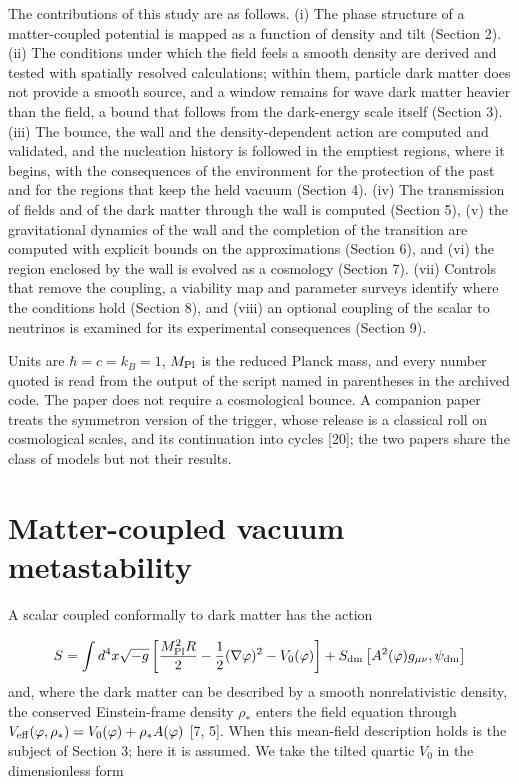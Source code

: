 \documentclass[preprint,12pt]{elsarticle}
\begin{document}
The contributions of this study are as follows. (i) The phase structure of a matter-coupled potential is mapped as a function of density and tilt (Section 2). (ii) The conditions under which the field feels a smooth density are derived and tested with spatially resolved calculations; within them, particle dark matter does not provide a smooth source, and a window remains for wave dark matter heavier than the field, a bound that follows from the dark-energy scale itself (Section 3). (iii) The bounce, the wall and the density-dependent action are computed and validated, and the nucleation history is followed in the emptiest regions, where it begins, with the consequences of the environment for the protection of the past and for the regions that keep the held vacuum (Section 4). (iv) The transmission of fields and of the dark matter through the wall is computed (Section 5), (v) the gravitational dynamics of the wall and the completion of the transition are computed with explicit bounds on the approximations (Section 6), and (vi) the region enclosed by the wall is evolved as a cosmology (Section 7). (vii) Controls that remove the coupling, a viability map and parameter surveys identify where the conditions hold (Section 8), and (viii) an optional coupling of the scalar to neutrinos is examined for its experimental consequences (Section 9).

Units are $\hbar=c=k_B=1$, $M_{\rm Pl}$ is the reduced Planck mass, and every number quoted is read from the output of the script named in parentheses in the archived code. The paper does not require a cosmological bounce. A companion paper treats the symmetron version of the trigger, whose release is a classical roll on cosmological scales, and its continuation into cycles [20]; the two papers share the class of models but not their results.

\section{Matter-coupled vacuum metastability}
A scalar coupled conformally to dark matter has the action

\begin{equation}
S=\int d^4x\sqrt{-g}\left[\frac{M_{\rm Pl}^2R}{2}-\frac{1}{2}(\nabla\varphi)^2-V_0(\varphi)\right]+S_{\rm dm}\left[A^2(\varphi)g_{\mu\nu},\psi_{\rm dm}\right]
\end{equation}
and, where the dark matter can be described by a smooth nonrelativistic density, the conserved Einstein-frame density $\rho_*$ enters the field equation through $V_{\rm eff}(\varphi,\rho_*)=V_0(\varphi)+\rho_*A(\varphi)$ [7, 5]. When this mean-field description holds is the subject of Section 3; here it is assumed. We take the tilted quartic $V_0$ in the dimensionless form
\end{document}
